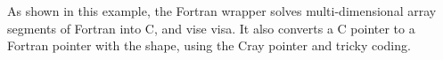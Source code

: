 As shown in this example, the Fortran wrapper solves
multi-dimensional array segments of Fortran into C, and vise visa.
It also converts a C pointer to a Fortran pointer with the shape, using
the Cray pointer and tricky coding.



